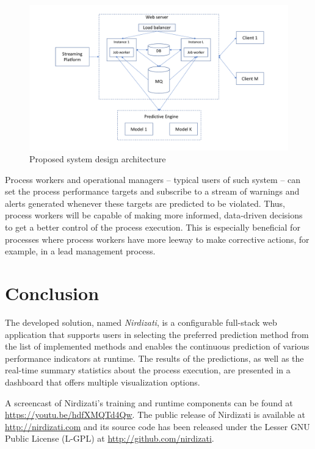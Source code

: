 \documentclass[runningheads,a4paper]{llncs}
\begin{document}
\begin{figure}
	\centering
	\includegraphics[width=1\textwidth]{img/nirdizati-runtime}
	\caption{Proposed system design architecture}
	\label{fig:nirdizati-runtime}
\end{figure}

Process workers and operational managers – typical users of such system – can set the process performance targets and subscribe to a stream of warnings and alerts generated whenever these targets are predicted to be violated. Thus, process workers will be capable of making more informed, data-driven decisions to get a better control of the process execution. This is especially beneficial for processes where process workers have more leeway to make corrective actions, for example, in a lead management process.

\section{Conclusion} \label{sec:conclusion}
The developed solution, named \emph{Nirdizati}, is a configurable full-stack web application that supports users in selecting the preferred prediction method from the list of implemented methods and enables the continuous prediction of various performance indicators at runtime.
The results of the predictions, as well as the real-time summary statistics about the process execution, are presented in a dashboard that offers multiple visualization options.

A screencast of Nirdizati's training and runtime components can be found at \url{https://youtu.be/hdfXMQTd4Qw}. The public release of Nirdizati is available at \url{http://nirdizati.com} and its source code has been released under the Lesser GNU Public License (L-GPL) at \url{http://github.com/nirdizati}.


\end{document}
